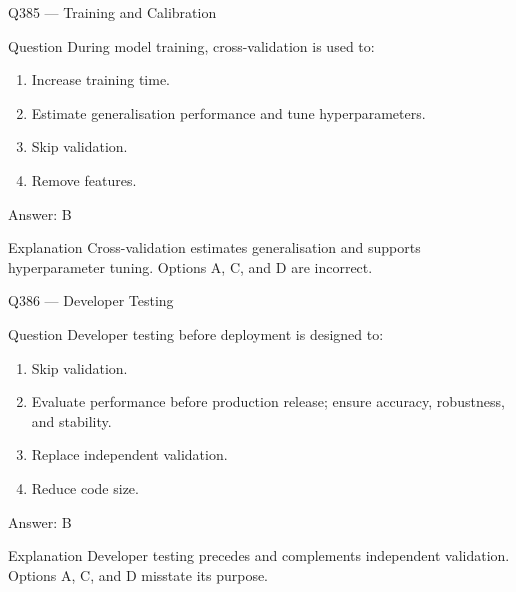 \documentclass[aspectratio=169,8pt]{beamer}
\begin{document}
	\begin{frame}{Q385 --- Training and Calibration}
		\begin{block}{Question}
			During model training, cross-validation is used to:
			\begin{enumerate}
				\item Increase training time.
				\item Estimate generalisation performance and tune hyperparameters.
				\item Skip validation.
				\item Remove features.
			\end{enumerate}
		\end{block}
		\begin{exampleblock}{Answer: B}\end{exampleblock}
		\begin{block}{Explanation}
			Cross-validation estimates generalisation and supports hyperparameter tuning. Options A, C, and D are incorrect.
		\end{block}
	\end{frame}
	
	\begin{frame}{Q386 --- Developer Testing}
		\begin{block}{Question}
			Developer testing before deployment is designed to:
			\begin{enumerate}
				\item Skip validation.
				\item Evaluate performance before production release; ensure accuracy, robustness, and stability.
				\item Replace independent validation.
				\item Reduce code size.
			\end{enumerate}
		\end{block}
		\begin{exampleblock}{Answer: B}\end{exampleblock}
		\begin{block}{Explanation}
			Developer testing precedes and complements independent validation. Options A, C, and D misstate its purpose.
		\end{block}
	\end{frame}
	
\end{document}
